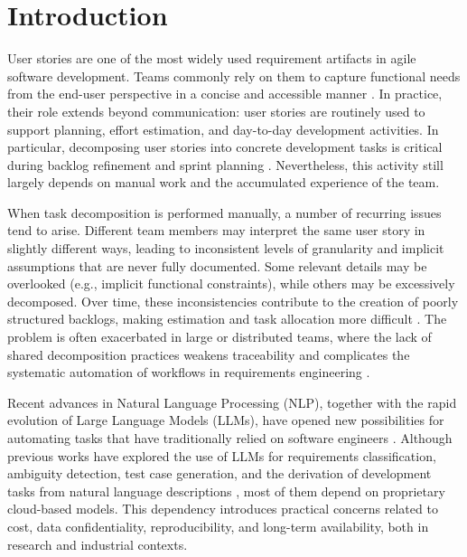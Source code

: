 \documentclass[pdflatex,sn-mathphys-num]{sn-jnl}%
\theoremstyle{thmstyleone}%
\theoremstyle{thmstyletwo}%
\theoremstyle{thmstylethree}%
\begin{document}

\maketitle

\section{Introduction}\label{sec1}

User stories are one of the most widely used requirement artifacts in agile software development. Teams commonly rely on them to capture functional needs from the end-user perspective in a concise and accessible manner \cite{cohn2004, beck2001}. In practice, their role extends beyond communication: user stories are routinely used to support planning, effort estimation, and day-to-day development activities. In particular, decomposing user stories into concrete development tasks is critical during backlog refinement and sprint planning \cite{rubin2012, schwaber2020}. Nevertheless, this activity still largely depends on manual work and the accumulated experience of the team.

When task decomposition is performed manually, a number of recurring issues tend to arise. Different team members may interpret the same user story in slightly different ways, leading to inconsistent levels of granularity and implicit assumptions that are never fully documented. Some relevant details may be overlooked (e.g., implicit functional constraints), while others may be excessively decomposed. Over time, these inconsistencies contribute to the creation of poorly structured backlogs, making estimation and task allocation more difficult \cite{lucassen2016}. The problem is often exacerbated in large or distributed teams, where the lack of shared decomposition practices weakens traceability and complicates the systematic automation of workflows in requirements engineering \cite{gorschek2006}.

Recent advances in Natural Language Processing (NLP), together with the rapid evolution of Large Language Models (LLMs), have opened new possibilities for automating tasks that have traditionally relied on software engineers \cite{chen2021, white2023}. Although previous works have explored the use of LLMs for requirements classification, ambiguity detection, test case generation, and the derivation of development tasks from natural language descriptions \cite{rahimi2023, sebban2024}, most of them depend on proprietary cloud-based models. This dependency introduces practical concerns related to cost, data confidentiality, reproducibility, and long-term availability, both in research and industrial contexts.
\end{document}
